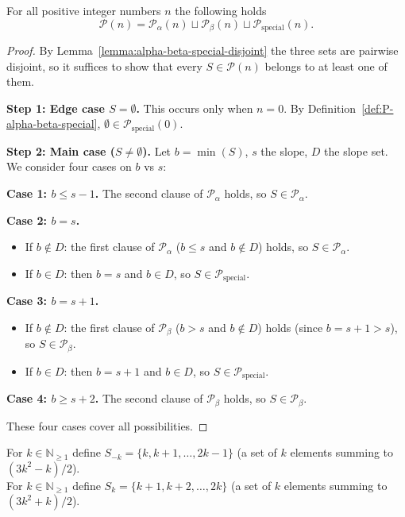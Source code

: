 \begin{lemma}\label{lemma:alpha-beta-special}\leanok
For all positive integer numbers $n$ the following holds $$\mathcal{P}(n)=\mathcal{P}_{\alpha}(n)\sqcup\mathcal{P}_{\beta}(n)\sqcup\mathcal{P}_{\mathrm{special}}(n).$$
\end{lemma}
\begin{proof}\leanok
By Lemma~\ref{lemma:alpha-beta-special-disjoint} the three sets are pairwise disjoint, so it suffices to show that every $S \in \mathcal{P}(n)$ belongs to at least one of them.


\textbf{Step 1: Edge case $S = \emptyset$.}
This occurs only when $n = 0$. By Definition~\ref{def:P-alpha-beta-special}, $\emptyset \in \mathcal{P}_{\mathrm{special}}(0)$.


\textbf{Step 2: Main case ($S \neq \emptyset$).}
Let $b = \min(S)$, $s$ the slope, $D$ the slope set. We consider four cases on $b$ vs $s$:

\textbf{Case 1: $b \leq s - 1$.}
The second clause of $\mathcal{P}_\alpha$ holds, so $S \in \mathcal{P}_\alpha$.

\textbf{Case 2: $b = s$.}
\begin{itemize}
\item If $b \notin D$: the first clause of $\mathcal{P}_\alpha$ ($b \leq s$ and $b \notin D$) holds, so $S \in \mathcal{P}_\alpha$.
\item If $b \in D$: then $b = s$ and $b \in D$, so $S \in \mathcal{P}_{\mathrm{special}}$.
\end{itemize}

\textbf{Case 3: $b = s + 1$.}
\begin{itemize}
\item If $b \notin D$: the first clause of $\mathcal{P}_\beta$ ($b > s$ and $b \notin D$) holds (since $b = s + 1 > s$), so $S \in \mathcal{P}_\beta$.
\item If $b \in D$: then $b = s + 1$ and $b \in D$, so $S \in \mathcal{P}_{\mathrm{special}}$.
\end{itemize}

\textbf{Case 4: $b \geq s + 2$.}
The second clause of $\mathcal{P}_\beta$ holds, so $S \in \mathcal{P}_\beta$.

These four cases cover all possibilities.
\end{proof}


\begin{definition}\label{def:staircase-sets}\leanok
For $k \in \mathbb{N}_{\geq 1}$ define $ S_{-k}=\{k, k+1, \ldots, 2k-1\}$ (a set of $k$ elements summing to $(3k^2-k)/2$).\\
For $k\in\mathbb{N}_{\geq 1}$ define $S_{k}=\{k+1, k+2, \ldots, 2k\}$ (a set of $k$ elements summing to $(3k^2+k)/2$).
\end{definition}

